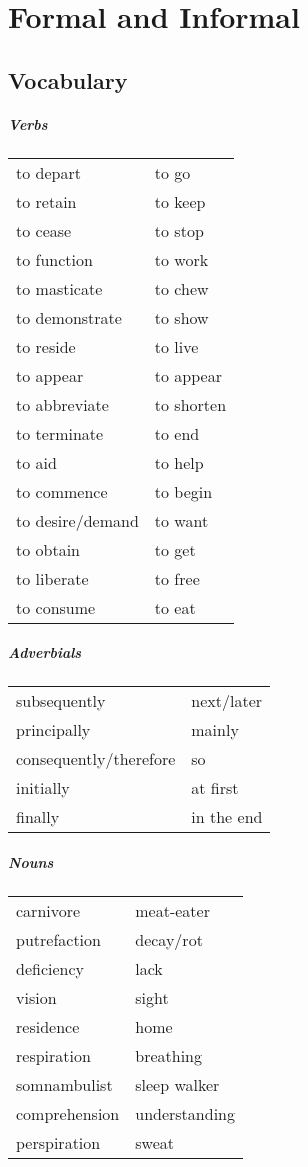 \chapter{Formal and Informal}
\section{Vocabulary}
\paragraph{Verbs}
\begin{tabular}{l l}
to depart & to go\\
to retain & to keep\\
to cease & to stop\\
to function & to work\\
to masticate & to chew\\
to demonstrate & to show\\
to reside & to live\\
\hline
to appear & to appear\\
to abbreviate & to shorten\\
to terminate & to end\\
to aid & to help\\
to commence & to begin\\
to desire/demand & to want\\
to obtain & to get\\
to liberate & to free\\
to consume & to eat
\end{tabular}

\paragraph{Adverbials}
\begin{tabular}{l l}
subsequently & next/later\\
principally & mainly\\
consequently/therefore & so\\
initially & at first\\
finally & in the end
\end{tabular}

\paragraph{Nouns}
\begin{tabular}{l l}
carnivore & meat-eater\\
putrefaction & decay/rot\\
deficiency & lack\\
vision & sight\\
residence & home\\
respiration & breathing\\
somnambulist & sleep walker\\
comprehension & understanding\\
perspiration & sweat
\end{tabular}

